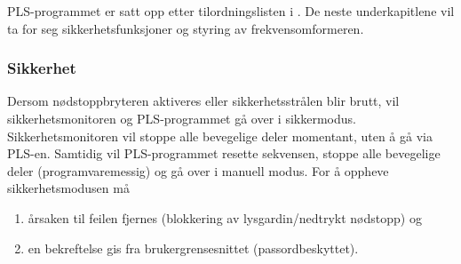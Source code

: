 \documentclass[Visionprosjekt.tex]{subfiles}
\begin{document}
%



PLS-programmet er satt opp etter tilordningslisten i . De neste underkapitlene vil ta for seg sikkerhetsfunksjoner og styring av frekvensomformeren.






\clearpage
\subsubsection{Sikkerhet}

Dersom nødstoppbryteren aktiveres eller sikkerhetsstrålen blir brutt, vil sikkerhetsmonitoren og PLS-programmet gå over i sikkermodus. Sikkerhetsmonitoren vil stoppe alle bevegelige deler momentant, uten å gå via PLS-en. Samtidig vil PLS-programmet resette sekvensen, stoppe alle bevegelige deler (programvaremessig) og gå over i manuell modus. For å oppheve sikkerhetsmodusen må

\begin{enumerate}
    \item årsaken til feilen fjernes (blokkering av lysgardin/nedtrykt nødstopp) og
	\item en bekreftelse gis fra brukergrensesnittet (passordbeskyttet).
\end{enumerate}
\end{document}
